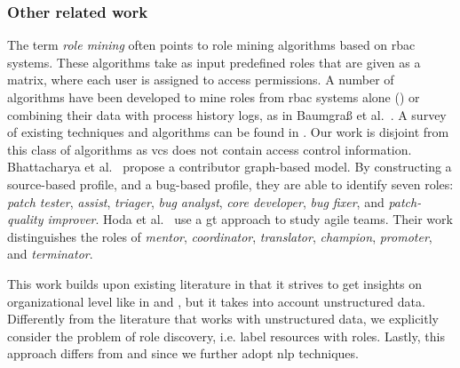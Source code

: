 \subsubsection{Other related work} The term \emph{role mining} often points to role mining algorithms based on \gls*{rbac} systems. These algorithms take as input predefined roles that are given as a matrix, where each user is assigned to access permissions. A number of algorithms have been developed to mine roles from \gls*{rbac} systems alone (\cite{Lu2015,frank2013role}) or combining their data with process history logs, as in Baumgraß et al.~\cite{baumgrass2012deriving}. A survey of existing techniques and algorithms can be found in \cite{Mitra2016}. Our work is disjoint from this class of algorithms as \gls*{vcs} does not contain access control information. 
Bhattacharya et al.~\cite{Bhattacharya2014} propose a contributor graph-based model. By constructing a source-based profile, and a bug-based profile, they are able to identify seven roles: \emph{patch tester}, \emph{assist}, \emph{triager}, \emph{bug analyst}, \emph{core developer}, \emph{bug fixer}, and \emph{patch-quality improver}. Hoda et al.~\cite{hoda2013self} use a \gls*{gt} approach to study agile teams. Their work distinguishes the roles of \emph{mentor}, \emph{coordinator}, \emph{translator}, \emph{champion}, \emph{promoter}, and \emph{terminator}.


This work builds upon existing literature in that it strives to get insights on organizational level like in \cite{rubin2007process} and \cite{Song2008}, but it takes into account unstructured data. Differently from the literature that works with unstructured data, we explicitly consider the problem of role discovery, i.e. label resources with roles. Lastly, this approach differs from \cite{Bhattacharya2014} and \cite{hoda2013self} since we further adopt \gls*{nlp} techniques.
